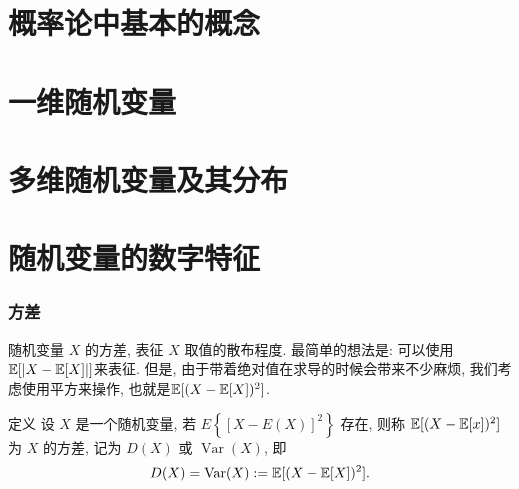 
\usepackage{ctex}
\usepackage{pifont}
\usepackage{cleveref}
\usepackage{pstricks}
\usepackage{pgfplots}





\part{概率论中基本的概念}


\begin{shaded}
    
\end{shaded}


\begin{shaded}
    
\end{shaded}

\part{一维随机变量}





\part{多维随机变量及其分布}





\part{随机变量的数字特征}





\section{方差}
随机变量 $X$ 的方差, 表征 $X$ 取值的散布程度. 最简单的想法是: 可以使用$\mathbb E[|X-\mathbb E[X]|]$来表征. 但是, 由于带着绝对值在求导的时候会带来不少麻烦, 我们考虑使用平方来操作, 也就是$\mathbb E[(X-\mathbb E[X])^2]$. 

\begin{definition}
    定义 设 $X$ 是一个随机变量, 若 $E\left\{[X-E(X)]^2\right\}$ 存在, 则称 $\mathbb E[(X-\mathbb E[x])^2]$ 为 $X$ 的方差, 记为 $D(X)$ 或 $\operatorname{Var}(X)$, 即
$$
D(X)=\operatorname{Var}(X):=\mathbb E[(X-\mathbb E[X])^2].
$$
\end{definition}

